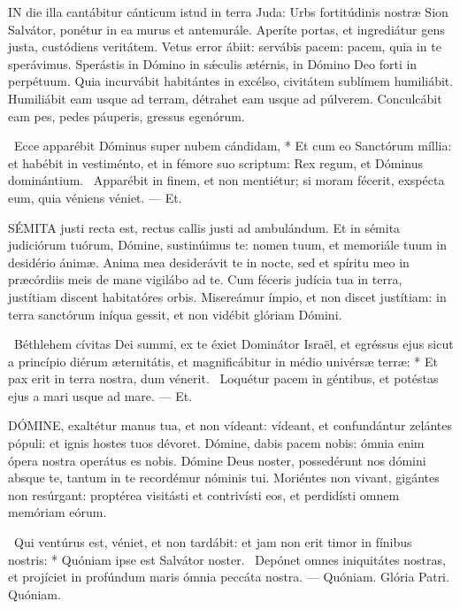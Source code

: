

\lettrine[lines=2]{I}{N} die illa cantábitur cánticum istud in terra Juda: Urbs fortitúdinis nostræ Sion Salvátor, ponétur in ea murus et antemurále. Aperíte portas, et ingrediátur gens justa, custódiens veritátem. Vetus error ábiit: servábis pacem: pacem, quia in te sperávimus. Sperástis in Dómino in sǽculis ætérnis, in Dómino Deo forti in perpétuum. Quia incurvábit habitántes in excélso, civitátem sublímem humiliábit. Humiliábit eam usque ad terram, détrahet eam usque ad púlverem. Conculcábit eam pes, pedes páuperis, gressus egenórum.

\R\ Ecce apparébit Dóminus super nubem cándidam, * Et cum eo Sanctórum míllia: et habébit in vestiménto, et in fémore suo scriptum: Rex regum, et Dóminus dominántium. \V\ Apparébit in finem, et non mentiétur; si moram fécerit, exspécta eum, quia véniens véniet. --- Et.


\lettrine[lines=2]{S}{ÉMITA} justi recta est, rectus callis justi ad ambulándum. Et in sémita judiciórum tuórum, Dómine, sustinúimus te: nomen tuum, et memoriále tuum in desidério ánimæ. Anima mea desiderávit te in nocte, sed et spíritu meo in præcórdiis meis de mane vigilábo ad te. Cum féceris judícia tua in terra, justítiam discent habitatóres orbis. Misereámur ímpio, et non discet justítiam: in terra sanctórum iníqua gessit, et non vidébit glóriam Dómini.

\R\ Béthlehem cívitas Dei summi, ex te éxiet Dominátor Israël, et egréssus ejus sicut a princípio diérum æternitátis, et magnificábitur in médio univérsæ terræ: * Et pax erit in terra nostra, dum vénerit. \V\ Loquétur pacem in géntibus, et potéstas ejus a mari usque ad mare. --- Et.


\lettrine[lines=2]{D}{ÓMINE}, exaltétur manus tua, et non vídeant: vídeant, et confundántur zelántes pópuli: et ignis hostes tuos dévoret. Dómine, dabis pacem nobis: ómnia enim ópera nostra operátus es nobis. Dómine Deus noster, possedérunt nos dómini absque te, tantum in te recordémur nóminis tui. Moriéntes non vivant, gigántes non resúrgant: proptérea visitásti et contrivísti eos, et perdidísti omnem memóriam eórum.

\R\ Qui ventúrus est, véniet, et non tardábit: et jam non erit timor in fínibus nostris: * Quóniam ipse est Salvátor noster. \V\ Depónet omnes iniquitátes nostras, et projíciet in profúndum maris ómnia peccáta nostra. --- Quóniam. Glória Patri. Quóniam.

